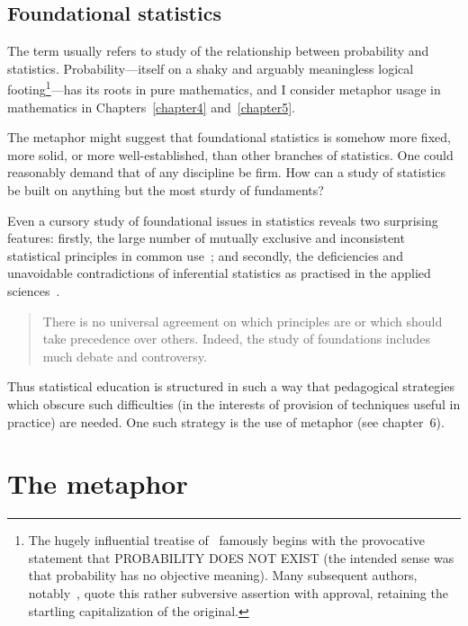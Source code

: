 \subsection{Foundational statistics}

The term  usually refers to study of
the relationship between probability and statistics.
Probability---itself on a shaky and arguably meaningless logical
footing\footnote{The hugely influential treatise
  of~ famously begins with the provocative
  statement that PROBABILITY DOES NOT EXIST (the intended sense was
  that probability has no objective meaning).  Many subsequent
  authors, notably~, quote this rather subversive
  assertion with approval, retaining the startling capitalization of
  the original.}---has its roots in pure mathematics, and I consider
metaphor usage in mathematics in Chapters~\ref{chapter4}
and~\ref{chapter5}.

The  metaphor might suggest that foundational
statistics is somehow more fixed, more solid, or more
well-established, than other branches of statistics.  One could
reasonably demand that  of any discipline be firm.
How can a study of statistics be built on anything but the most sturdy
of fundaments?

Even a cursory study of foundational issues in statistics reveals two
surprising features: firstly, the large number of mutually exclusive
and inconsistent statistical principles in common
use~\parencite{edwards1984}; and secondly, the deficiencies and
unavoidable contradictions of inferential statistics as practised in
the applied sciences~\parencite{wasserstein2016}.

\begin{singlespace}
\begin{quote}
There is no universal agreement on which principles are 
or which should take precedence over others.  Indeed, the study of
foundations includes much debate and controversy.  
\end{quote}
\end{singlespace}

\noindent
Thus statistical education is structured in such a way that
pedagogical strategies which obscure such difficulties (in the
interests of provision of techniques useful in practice) are needed.
One such strategy is the use of metaphor (see chapter~6).

\section{The  metaphor}

